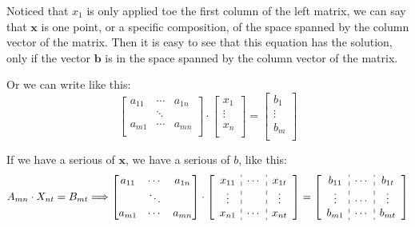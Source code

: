 \documentclass[UTF8]{../09-Mathematics}
\begin{document}
Noticed that $x_1$ is only applied toe the first column of the left matrix, we can say that $ \boldsymbol x$ is one point, or a specific composition, of the space spanned by the column vector of the matrix. Then it is easy to see that this equation has the solution, only if the vector $ \boldsymbol b$ is in the space spanned by the column vector of the matrix.


Or we can write like this:
\begin{equation}
  \begin{bmatrix}
     a_{11} & \cdots & a_{1n}\\
     & \ddots & \\
     a_{m1} & \cdots & a_{mn} \\
  \end{bmatrix}
  \cdot
  \begin{bmatrix}
    x_1 \\
    \vdots \\
    x_n \\
  \end{bmatrix}
  =
  \begin{bmatrix}
    b_1 \\
    \vdots \\
    b_m \\
  \end{bmatrix}
\end{equation}



If we have a serious of $\boldsymbol x$, we have a serious of $b$, like this:
\begin{equation}
  A_{mn} \cdot X_{nt} = B_{mt}
  \Longrightarrow
  \begin{bmatrix}
     a_{11} & \cdots & a_{1n}\\
     & \ddots & \\
     a_{m1} & \cdots & a_{mn} \\
  \end{bmatrix}
  \cdot
  \left[
    \begin{array}{c:c:c}
      x_{11} & \cdots & x_{1t}\\
     \vdots&  & \vdots \\
     x_{n1} & \cdots & x_{nt} \\
    \end{array}
 \right] 
  =
 \left[
    \begin{array}{c:c:c}
      b_{11} & \cdots & b_{1t}\\
      \vdots& \cdots & \vdots \\
      b_{m1} & \cdots & b_{mt} \\
    \end{array}
 \right] 
\end{equation}
\end{document}
